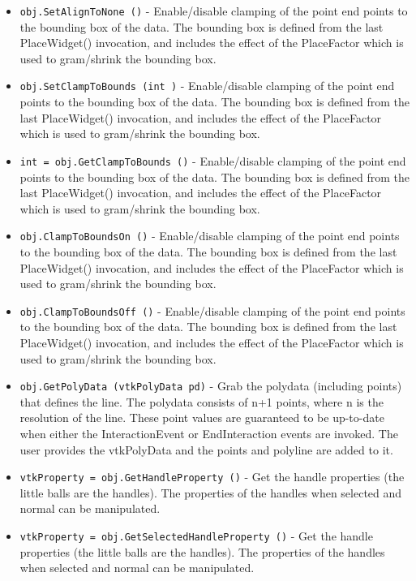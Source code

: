 \begin{itemize}
\item  \verb|obj.SetAlignToNone ()| -  Enable/disable clamping of the point end points to the bounding box
 of the data. The bounding box is defined from the last PlaceWidget()
 invocation, and includes the effect of the PlaceFactor which is used
 to gram/shrink the bounding box.

\item  \verb|obj.SetClampToBounds (int )| -  Enable/disable clamping of the point end points to the bounding box
 of the data. The bounding box is defined from the last PlaceWidget()
 invocation, and includes the effect of the PlaceFactor which is used
 to gram/shrink the bounding box.

\item  \verb|int = obj.GetClampToBounds ()| -  Enable/disable clamping of the point end points to the bounding box
 of the data. The bounding box is defined from the last PlaceWidget()
 invocation, and includes the effect of the PlaceFactor which is used
 to gram/shrink the bounding box.

\item  \verb|obj.ClampToBoundsOn ()| -  Enable/disable clamping of the point end points to the bounding box
 of the data. The bounding box is defined from the last PlaceWidget()
 invocation, and includes the effect of the PlaceFactor which is used
 to gram/shrink the bounding box.

\item  \verb|obj.ClampToBoundsOff ()| -  Enable/disable clamping of the point end points to the bounding box
 of the data. The bounding box is defined from the last PlaceWidget()
 invocation, and includes the effect of the PlaceFactor which is used
 to gram/shrink the bounding box.

\item  \verb|obj.GetPolyData (vtkPolyData pd)| -  Grab the polydata (including points) that defines the line.  The
 polydata consists of n+1 points, where n is the resolution of the
 line. These point values are guaranteed to be up-to-date when either the
 InteractionEvent or EndInteraction events are invoked. The user provides
 the vtkPolyData and the points and polyline are added to it.

\item  \verb|vtkProperty = obj.GetHandleProperty ()| -  Get the handle properties (the little balls are the handles). The
 properties of the handles when selected and normal can be
 manipulated.

\item  \verb|vtkProperty = obj.GetSelectedHandleProperty ()| -  Get the handle properties (the little balls are the handles). The
 properties of the handles when selected and normal can be
 manipulated.


\end{itemize}

